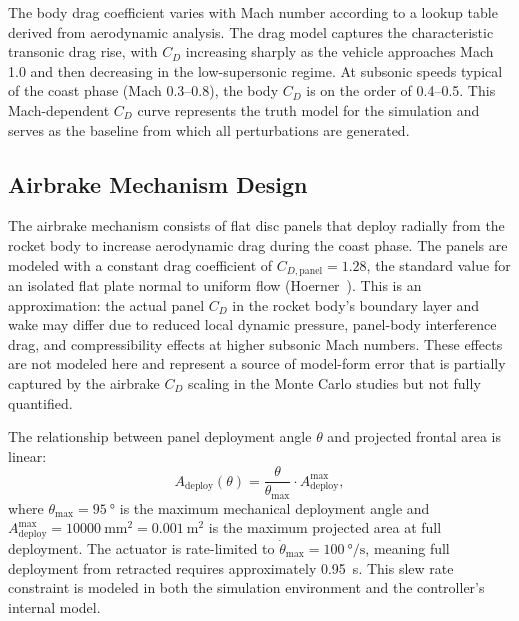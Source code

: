 \documentclass[11pt,letterpaper]{article}
\newcommand{\Cd}{C_D}
\newcommand{\Cdpanel}{C_{D,\mathrm{panel}}}
\newcommand{\Adeploy}{A_{\mathrm{deploy}}}
\begin{document}
The body drag coefficient varies with Mach number according to a lookup table derived from aerodynamic analysis. The drag model captures the characteristic transonic drag rise, with $\Cd$ increasing sharply as the vehicle approaches Mach 1.0 and then decreasing in the low-supersonic regime. At subsonic speeds typical of the coast phase (Mach 0.3--0.8), the body $\Cd$ is on the order of 0.4--0.5. This Mach-dependent $\Cd$ curve represents the truth model for the simulation and serves as the baseline from which all perturbations are generated.


\subsection{Airbrake Mechanism Design}
\label{sec:airbrake_design}

The airbrake mechanism consists of flat disc panels that deploy radially from the rocket body to increase aerodynamic drag during the coast phase. The panels are modeled with a constant drag coefficient of $\Cdpanel = 1.28$, the standard value for an isolated flat plate normal to uniform flow (Hoerner~\cite{hoerner1965}). This is an approximation: the actual panel $\Cd$ in the rocket body's boundary layer and wake may differ due to reduced local dynamic pressure, panel-body interference drag, and compressibility effects at higher subsonic Mach numbers. These effects are not modeled here and represent a source of model-form error that is partially captured by the airbrake $\Cd$ scaling in the Monte Carlo studies but not fully quantified.

The relationship between panel deployment angle $\theta$ and projected frontal area is linear:
\begin{equation}
    \Adeploy(\theta) = \frac{\theta}{\theta_{\max}} \cdot \Adeploy^{\max},
    \label{eq:area_angle}
\end{equation}
where $\theta_{\max} = \SI{95}{\degree}$ is the maximum mechanical deployment angle and $\Adeploy^{\max} = \SI{10000}{\milli\metre\squared} = \SI{0.001}{\metre\squared}$ is the maximum projected area at full deployment. The actuator is rate-limited to $\dot{\theta}_{\max} = \SI{100}{\degree\per\second}$, meaning full deployment from retracted requires approximately \SI{0.95}{\second}. This slew rate constraint is modeled in both the simulation environment and the controller's internal model.
\end{document}
